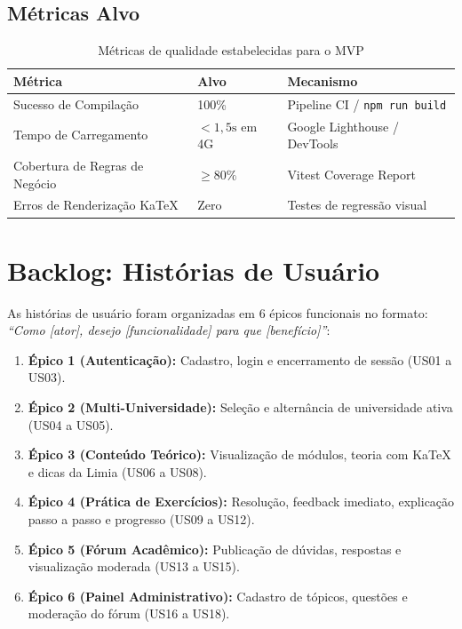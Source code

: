 \documentclass[12pt, a4paper]{article}
\begin{document}
\subsection{M\'{e}tricas Alvo}

\begin{table}[H]
\centering
\caption{M\'{e}tricas de qualidade estabelecidas para o MVP}
\begin{tabularx}{\textwidth}{l l X}
\toprule
\textbf{M\'{e}trica} & \textbf{Alvo} & \textbf{Mecanismo} \\
\midrule
Sucesso de Compila\c{c}\~{a}o & 100\% & Pipeline CI / \texttt{npm run build} \\
Tempo de Carregamento & $< 1{,}5\text{s}$ em 4G & Google Lighthouse / DevTools \\
Cobertura de Regras de Neg\'{o}cio & $\geq 80\%$ & Vitest Coverage Report \\
Erros de Renderiza\c{c}\~{a}o KaTeX & Zero & Testes de regress\~{a}o visual \\
\bottomrule
\end{tabularx}
\end{table}

\section{Backlog: Hist\'{o}rias de Usu\'{a}rio}

As hist\'{o}rias de usu\'{a}rio foram organizadas em 6 \'{e}picos funcionais no formato: \textit{``Como [ator], desejo [funcionalidade] para que [benef\'{i}cio]''}:

\begin{enumerate}[leftmargin=2cm]
  \item \textbf{\'{E}pico 1 (Autentica\c{c}\~{a}o):} Cadastro, login e encerramento de sess\~{a}o (US01 a US03).
  \item \textbf{\'{E}pico 2 (Multi-Universidade):} Sele\c{c}\~{a}o e altern\^{a}ncia de universidade ativa (US04 a US05).
  \item \textbf{\'{E}pico 3 (Conte\'{u}do Te\'{o}rico):} Visualiza\c{c}\~{a}o de m\'{o}dulos, teoria com KaTeX e dicas da Limia (US06 a US08).
  \item \textbf{\'{E}pico 4 (Pr\'{a}tica de Exerc\'{i}cios):} Resolu\c{c}\~{a}o, feedback imediato, explica\c{c}\~{a}o passo a passo e progresso (US09 a US12).
  \item \textbf{\'{E}pico 5 (F\'{o}rum Acad\^{e}mico):} Publica\c{c}\~{a}o de d\'{u}vidas, respostas e visualiza\c{c}\~{a}o moderada (US13 a US15).
  \item \textbf{\'{E}pico 6 (Painel Administrativo):} Cadastro de t\'{o}picos, quest\~{o}es e modera\c{c}\~{a}o do f\'{o}rum (US16 a US18).
\end{enumerate}
\end{document}
